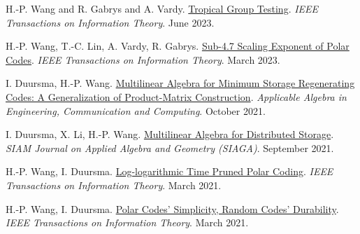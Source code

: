 \documentclass{article}
\def\sec#1{\vskip1em\textbf{\fs1#1}}
\def\fs#1{%
        \pgfmathsetmacro\a{#1}%
        \pgfmathsetmacro\A{\parskip*(4/3)^\a}%
        \pgfmathsetmacro\B{\A*(4/3)}%
        \fontsize{\A pt}{\B pt}\selectfont%
    }
\begin{document}
\bgroup
\def\section#1#2{\sec{Journal Publications \mdseries (new to old)}}
\begin{thebibliography}{J9}
    H.-P. Wang and R. Gabrys and A. Vardy.
    \href{https://doi.org/10.1109/TIT.2023.3282847}
    {Tropical Group Testing}.
    \emph{IEEE Transactions on Information Theory}.
    June 2023.

    H.-P. Wang, T.-C. Lin, A. Vardy, R. Gabrys.
    \href{https://doi.org/10.1109/TIT.2023.3253074}
    {Sub-4.7 Scaling Exponent of Polar Codes}.
    \emph{IEEE Transactions on Information Theory}.
    March 2023.

    I. Duursma, H.-P. Wang.
    \href{https://doi.org/10.1007/s00200-021-00526-3}
    {Multilinear Algebra for Minimum Storage Regenerating Codes: A Generalization of Product-Matrix Construction}.
    \emph{Applicable Algebra in Engineering, Communication and Computing}.
    October 2021.

    I. Duursma, X. Li, H.-P. Wang.
    \href{https://doi.org/10.1137/20M1346742}
    {Multilinear Algebra for Distributed Storage}.
    \emph{SIAM Journal on Applied Algebra and Geometry (SIAGA)}.
    September 2021.

    H.-P. Wang, I. Duursma.
    \href{https://doi.org/10.1109/TIT.2020.3041523}
    {Log-logarithmic Time Pruned Polar Coding}.
    \emph{IEEE Transactions on Information Theory}.
    March 2021.

    H.-P. Wang, I. Duursma.
    \href{https://doi.org/10.1109/TIT.2020.3041570}
    {Polar Codes' Simplicity, Random Codes' Durability}.
    \emph{IEEE Transactions on Information Theory}.
    March 2021.
\end{thebibliography}
\egroup
\end{document}
